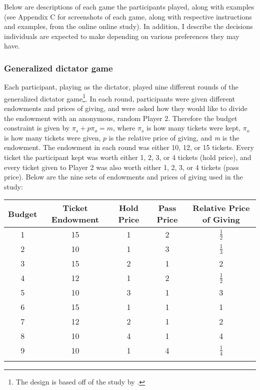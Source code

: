\documentclass[12pt]{article}
\begin{document}
Below are descriptions of each game the participants played, along with examples (see Appendix C for screenshots of each game, along with respective instructions and examples, from the online online study). In addition, I describe the decisions individuals are expected to make depending on various preferences they may have.

\subsubsection{Generalized dictator game}

Each participant, playing as the dictator, played nine different rounds of the generalized dictator game\footnote{The design is based off of the study by \cite{andreoni_miller_2002}.}. In each round, participants were given different endowments and prices of giving, and were asked how they would like to divide the endowment with an anonymous, random Player 2. Therefore the budget constraint is given by \(\pi_{s} + p\pi_{o} = \textit{m}\), where \(\pi_{s}\) is how many tickets were kept, \(\pi_{o}\) is how many tickets were given, \(p\) is the relative price of giving, and \textit{m} is the endowment. The endowment in each round was either 10, 12, or 15 tickets. Every ticket the participant kept was worth either 1, 2, 3, or 4 tickets (hold price), and every ticket given to Player 2 was also worth either 1, 2, 3, or 4 tickets (pass price). Below are the nine sets of endowments and prices of giving used in the study:


\begin{center}
\begin{tabular}{ c c c c c }
\hline \hline
 Budget & Ticket Endowment & Hold Price & Pass Price & Relative Price of Giving \\ 
 \hline
1 & 15 & 1 & 2 & \(\frac{1}{2}\)  \\  
2 & 10 & 1 & 3 & \(\frac{1}{3}\)  \\  
3 & 15 & 2 & 1 & 2 \\  
4 & 12 & 1 & 2 & \(\frac{1}{2}\)  \\  
5 & 10 & 3 & 1 & 3  \\  
6 & 15 & 1 & 1 & 1  \\  
7 & 12 & 2 & 1 & 2 \\  
8 & 10 & 4 & 1 & 4 \\  
9 & 10 & 1 & 4 & \(\frac{1}{4}\)  \\ 
\hline \hline \\
\end{tabular}
\end{center}
\end{document}
